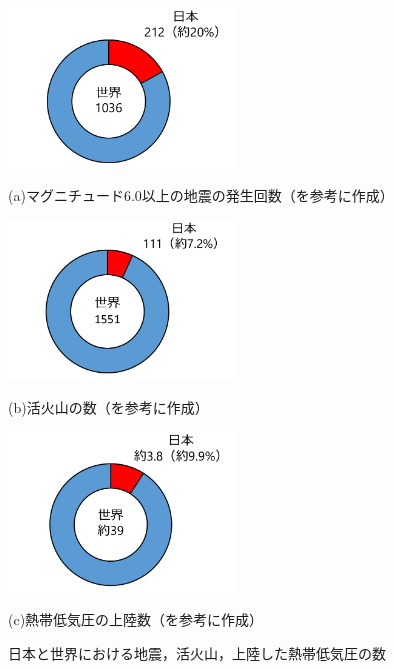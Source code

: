 \begin{figure}[b]
	\begin{center}

		\begin{minipage}[b]{\linewidth}
		\centering
		\includegraphics[width=6cm]{./Ch1_Introduction/Fig/num_japan_world_earthquake_compressed.pdf}
		\caption*{(a)マグニチュード6.0以上の地震の発生回数（\cite{内閣府2010}を参考に作成）}
		\end{minipage}

		\vspace{1cm}

		\begin{minipage}[b]{\linewidth}
		\centering
		\includegraphics[width=6cm]{./Ch1_Introduction/Fig/num_japan_world_volcano_compressed.pdf}
		\caption*{(b)活火山の数（\cite{内閣府2010}を参考に作成）} 
		\end{minipage}

		\vspace{1cm}

		\begin{minipage}[b]{\linewidth}
		\centering
		\includegraphics[width=6cm]{./Ch1_Introduction/Fig/num_japan_world_tyhoon_compressed.pdf}
		\caption*{(c)熱帯低気圧の上陸数（\cite{廣瀬2014}を参考に作成）} 
		\end{minipage}
	
	\caption{日本と世界における地震，活火山，上陸した熱帯低気圧の数}\label{fig:num_disaster}
	\end{center}
\end{figure}

